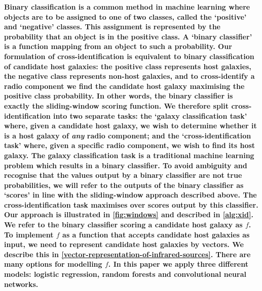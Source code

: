 \documentclass[fleqn,usenatbib,usedcolumn]{mnras}
\newcommand{\edited}[1]{{\bf {#1}}}
\begin{document}
    \edited{Binary classification is a common method in machine learning
    where objects are to be assigned to one of two classes,
    called the `positive' and `negative' classes. This assignment is
    represented by the probability that an object is in the positive class. A
    `binary classifier' is a function mapping from an object to such a
    probability. Our formulation of cross-identification is equivalent to
    binary classification of candidate host galaxies: the positive class
    represents host galaxies, the negative class represents non-host galaxies,
    and to cross-identify a radio component we find the candidate host galaxy
    maximising the positive class probability. In other words,
    the binary classifier is exactly the sliding-window scoring function. We therefore split
    cross-identification into two separate tasks: the `galaxy
    classification task' where, given a candidate host galaxy, we wish to
    determine whether it is a host galaxy of \emph{any} radio component; and
    the `cross-identification task' where, given a specific radio
    component, we wish to find its host galaxy. The galaxy classification task
    is a traditional machine learning problem which results in a binary
    classifier. To avoid ambiguity and recognise that the values output by a
    binary classifier are not true probabilities, we will refer to the outputs
    of the binary classifier as `scores' in line with the sliding-window approach
    described above. The cross-identification task maximises over scores
    output by this classifier. Our approach is illustrated in
    \autoref{fig:windows} and described in \autoref{alg:xid}. We refer to the
    binary classifier scoring a candidate host galaxy as
    $f$. To implement $f$ as a function that accepts candidate host galaxies
    as input, we need to represent candidate host galaxies by vectors. We
    describe this in \autoref{vector-representation-of-infrared-sources}.
    There are many options for modelling $f$. In this paper we apply three
    different models: logistic regression, random forests and convolutional
    neural networks.}
\end{document}

